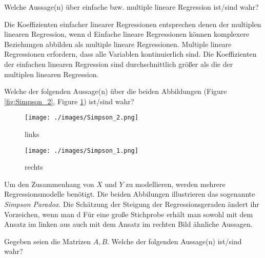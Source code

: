 \documentclass[10pt,addpoints]{exam}
\begin{document}
\begin{questions}
\question Welche Aussage(n) über einfache bzw. multiple lineare Regression ist/sind wahr?

\begin{choices}
\CorrectChoice Die Koeffizienten einfacher linearer Regressionen entsprechen denen der multiplen linearen Regression, wenn d
\choice Einfache lineare Regressionen können komplexere Beziehungen abbilden als multiple lineare Regressionen.
\choice Multiple lineare Regressionen erfordern, dass alle Variablen kontinuierlich sind.
\choice Die Koeffizienten der einfachen linearen Regression sind durchschnittlich größer als die der multiplen linearen Regression.
\end{choices}

\question Welche der folgenden Aussage(n) über die beiden Abbildungen (Figure \ref{fig:Simpson_2}, Figure \ref{fig:Simpson_1}) ist/sind wahr?\\

\begin{figure}[h!]
    \begin{minipage}{0.45\textwidth}
        \centering
        \texttt{[image: ./images/Simpson\_2.png]}
        \caption{links}
        \label{fig:Simpson_2}
    \end{minipage}%
    \hfill
    \begin{minipage}{0.45\textwidth}
        \centering
        \texttt{[image: ./images/Simpson\_1.png]}
        \caption{rechts}
                \label{fig:Simpson_1}
    \end{minipage}
\end{figure}

\begin{choices}
\choice Um den Zusammenhang von $X$ und $Y$ zu modellieren, werden mehrere Regressionsmodelle benötigt.
\CorrectChoice Die beiden Abbilungen illustrieren das sogenannte \textit{Simpson Paradox}. 
\CorrectChoice Die Schätzung der Steigung der Regressionsgeraden ändert ihr Vorzeichen, wenn man d
\choice Für eine große Stichprobe erhält man sowohl mit dem Ansatz im linken aus auch mit dem Ansatz im rechten Bild ähnliche Aussagen.
\end{choices}

\question Gegeben seien die Matrizen $A, B$. Welche der folgenden Aussage(n) ist/sind wahr?\\


\end{questions}
\end{document}
